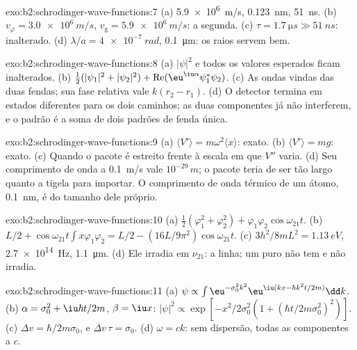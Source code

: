 \begin{solution}{exo:b2:schrodinger-wave-functions:7}
(a) \qty{5.9e6}{m/s}, \qty{0.123}{nm}, \qty{51}{ns}. (b) $v_\varphi = \qty{3.0e6}{m/s}$,
$v_{\text{g}} = \qty{5.9e6}{m/s}$: a segunda. (c) $\tau = \qty{1.7}{\micro s} \gg
\qty{51}{ns}$: inalterado. (d) $\lambda/a = \qty{4e-7}{rad}$, \qty{0.1}{\micro m}:
os raios servem bem.
\end{solution}

\begin{solution}{exo:b2:schrodinger-wave-functions:8}
(a) $|\psi|^2$ e todos os valores esperados ficam inalterados. (b) $\tfrac12(|\psi_1|^2
+ |\psi_2|^2) + \operatorname{Re}(\eu^{\iu\alpha}\psi_1^*\psi_2)$. (c) As ondas vindas
das duas fendas; sua fase relativa vale $k(r_2 - r_1)$. (d) O detector
termina em estados diferentes para os dois caminhos; as duas componentes já
não interferem, e o padrão é a soma de dois padrões de fenda
única.
\end{solution}

\begin{solution}{exo:b2:schrodinger-wave-functions:9}
(a) $\langle V'\rangle = m\omega^2\langle x\rangle$: exato. (b) $\langle V'\rangle
= mg$: exato. (c) Quando o pacote é estreito frente à escala em que
$V''$ varia. (d) Seu comprimento de onda a \qty{0.1}{m/s} vale $10^{-29}\,\unit{m}$; o
pacote teria de ser tão largo quanto a tigela para importar. O comprimento de onda
térmico de um átomo, \qty{0.1}{nm}, é do tamanho dele próprio.
\end{solution}

\begin{solution}{exo:b2:schrodinger-wave-functions:10}
(a) $\tfrac12(\varphi_1^2 + \varphi_2^2) + \varphi_1\varphi_2\cos\omega_{21}t$. (b) $L/2 +
\cos\omega_{21}t\int x\varphi_1\varphi_2 = L/2 - (16L/9\pi^2)\cos\omega_{21}t$. (c)
$3h^2/8mL^2 = \qty{1.13}{eV}$, \qty{2.7e14}{Hz}, \qty{1.1}{\micro m}. (d) Ele irradia
em $\nu_{21}$: a linha; um  puro não tem  e não irradia.
\end{solution}

\begin{solution}{exo:b2:schrodinger-wave-functions:11}
(a) $\psi \propto \int\eu^{-\sigma_0^2k^2}\eu^{\iu(kx - \hbar k^2t/2m)}\dd k$. (b) $\alpha =
\sigma_0^2 + \iu\hbar t/2m$, $\beta = \iu x$: $|\psi|^2 \propto \exp[-x^2/2\sigma_0^2(1 +
(\hbar t/2m\sigma_0^2)^2)]$. (c) $\Delta v = \hbar/2m\sigma_0$, e $\Delta v\,\tau =
\sigma_0$. (d) $\omega = ck$: sem dispersão, todas as componentes a $c$.
\end{solution}

